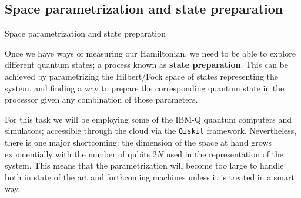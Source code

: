 \documentclass[9pt, handout, aspectratio=169]{beamer}	%
\begin{document}

\subsection{Space parametrization and state preparation}

\begin{frame}{Space parametrization and state preparation}

	Once we have ways of measuring our Hamiltonian, we need to be able to explore different quantum states; a process known as \textbf{state preparation}. This can be achieved by parametrizing the Hilbert/Fock space of states representing the system, and finding a way to prepare the corresponding quantum state in the processor given any combination of those parameters.

	\begin{multicols}{2}

		For this task we will be employing some of the IBM-Q quantum computers and simulators; accessible through the cloud via the \texttt{Qiskit} framework. Nevertheless, there is one major shortcoming: the dimension of the space at hand grows exponentially with the number of qubits $2N$ used in the representation of the system. This means that the parametrization will become too large to handle both in state of the art and forthcoming machines unless it is treated in a smart way.

		\columnbreak


\end{multicols}
\end{frame}
\end{document}
